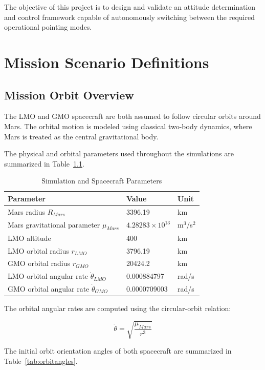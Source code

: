 \documentclass[12pt,a4paper]{report}
\begin{document}
	The objective of this project is to design and validate an attitude determination and control framework capable of autonomously switching between the required operational pointing modes.
	
	\chapter{Mission Scenario Definitions}
	
	\section{Mission Orbit Overview}
	
	The LMO and GMO spacecraft are both assumed to follow circular orbits around Mars. The orbital motion is modeled using classical two-body dynamics, where Mars is treated as the central gravitational body.
	
	The physical and orbital parameters used throughout the simulations are summarized in Table~\ref{tab:simparams}.
	\begin{table}[H]
		\centering
		\caption{Simulation and Spacecraft Parameters}
		\label{tab:simparams}
		\begin{tabular}{lll}
			\toprule
			Parameter & Value & Unit \\
			\midrule
			Mars radius $R_{Mars}$ & 3396.19 & km \\
			Mars gravitational parameter $\mu_{Mars}$ & $4.28283\times10^{13}$ & m$^3$/s$^2$ \\
			LMO altitude & 400 & km \\
			LMO orbital radius $r_{LMO}$ & 3796.19 & km \\
			GMO orbital radius $r_{GMO}$ & 20424.2 & km \\
			LMO orbital angular rate $\dot{\theta}_{LMO}$ & 0.000884797 & rad/s \\
			GMO orbital angular rate $\dot{\theta}_{GMO}$ & 0.0000709003 & rad/s \\
			\bottomrule
		\end{tabular}
	\end{table}
	
	The orbital angular rates are computed using the circular-orbit relation:
	
	\begin{equation}
		\dot{\theta} = \sqrt{\frac{\mu_{Mars}}{r^3}}
	\end{equation}
	
	The initial orbit orientation angles of both spacecraft are summarized in Table~\ref{tab:orbitangles}.
	
\end{document}
